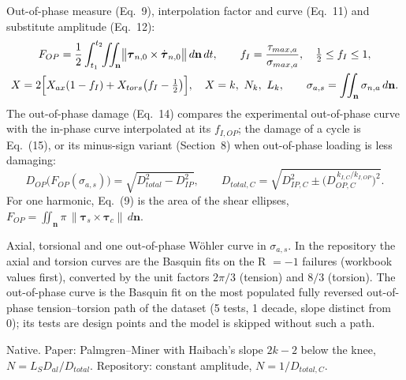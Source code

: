  Out-of-phase measure (Eq.~9), interpolation factor and curve (Eq.~11) and
substitute amplitude (Eq.~12):
\begin{gather}
F_{OP}=\frac12\int_{t_1}^{t_2}\!\!\iint_{\mathbf n}\bigl\|\boldsymbol\tau_{n,0}\times\dot{\boldsymbol\tau}_{n,0}\bigr\|\,d\mathbf n\,dt,\qquad
f_I=\frac{\tau_{max,a}}{\sigma_{max,a}},\quad\tfrac12\le f_I\le1,\\
X=2\Bigl[X_{ax}(1-f_I)+X_{tors}\bigl(f_I-\tfrac12\bigr)\Bigr],\quad X=k,\ N_k,\ L_k,\qquad
\sigma_{a,s}=\iint_{\mathbf n}\sigma_{n,a}\,d\mathbf n .\label{eq:bol-sas}
\end{gather}
The out-of-phase damage (Eq.~14) compares the experimental out-of-phase curve with the in-phase
curve interpolated at its $f_{I,OP}$; the damage of a cycle is Eq.~(15), or its minus-sign variant
(Section~8) when out-of-phase loading is less damaging:
\begin{equation}
D_{OP}\bigl(F_{OP}(\sigma_{a,s})\bigr)=\sqrt{D_{total}^2-D_{IP}^2},\qquad
D_{total,C}=\sqrt{D_{IP,C}^2\pm\bigl(D_{OP,C}^{\,k_{I,C}/k_{I,OP}}\bigr)^2}.
\end{equation}
For one harmonic, Eq.~(9) is the area of the shear ellipses,
$F_{OP}=\iint_{\mathbf n}\pi\,\|\boldsymbol\tau_s\times\boldsymbol\tau_c\|\,d\mathbf n$.

 Axial, torsional and one out-of-phase W\"ohler curve in
$\sigma_{a,s}$. In the repository the axial and torsion curves are the Basquin fits on the R $=-1$
failures (workbook values first), converted by the unit factors $2\pi/3$ (tension) and $8/3$
(torsion). The out-of-phase curve is the Basquin fit on the most populated fully reversed
out-of-phase tension--torsion path of the dataset (5 tests, 1 decade, slope distinct from 0); its
tests are design points and the model is skipped without such a path.

 Native. Paper: Palmgren--Miner with Haibach's slope $2k-2$ below the knee,
$N=L_S D_{al}/D_{total}$. Repository: constant amplitude, $N=1/D_{total,C}$.


